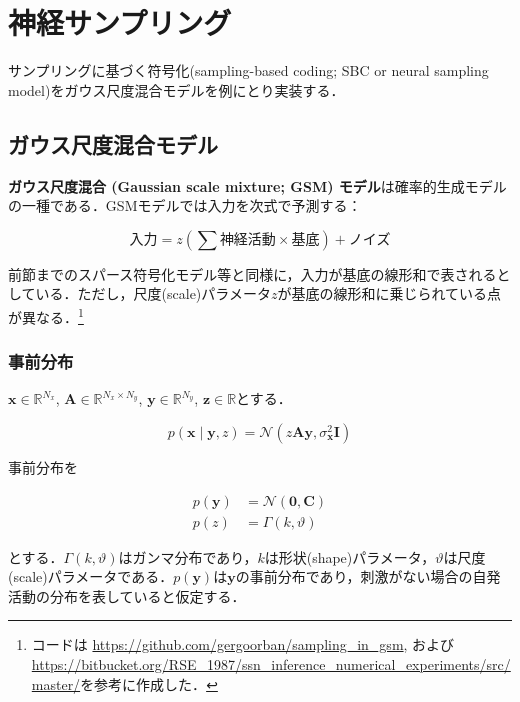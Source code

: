 \section{神経サンプリング}

サンプリングに基づく符号化(sampling-based coding; SBC or neural sampling model)をガウス尺度混合モデルを例にとり実装する．

\subsection{ガウス尺度混合モデル}
\textbf{ガウス尺度混合 (Gaussian scale mixture; GSM) モデル}は確率的生成モデルの一種である\cite{Wainwright1999-cl}\cite{Orban2016-tm}．GSMモデルでは入力を次式で予測する：


\begin{equation}
\text{入力}={z}\left(\sum \text{神経活動} \times \text{基底} \right) + \text{ノイズ}
\end{equation}


前節までのスパース符号化モデル等と同様に，入力が基底の線形和で表されるとしている．ただし，尺度(scale)パラメータ$z$が基底の線形和に乗じられている点が異なる．\footnote{コードは\cite{Orban2016-tm} \url{https://github.com/gergoorban/sampling_in_gsm}, および\cite{Echeveste2020-sh} \url{https://bitbucket.org/RSE_1987/ssn_inference_numerical_experiments/src/master/}を参考に作成した．}


\subsubsection{事前分布}
$\mathbf{x} \in \mathbb{R}^{N_x}$, $\mathbf{A} \in \mathbb{R}^{N_x\times N_y}$, $\mathbf{y} \in \mathbb{R}^{N_y}$, $\mathbf{z} \in \mathbb{R}$とする．


\begin{equation}
p\left(\mathbf{x}\mid\mathbf{y}, z\right)=\mathcal{N}\left(z \mathbf{A} \mathbf{y}, \sigma_{\mathbf{x}}^{2} \mathbf{I}\right)
\end{equation}


事前分布を


\begin{align}
p\left(\mathbf{y}\right)&=\mathcal{N}\left(\mathbf{0}, \mathbf{C}\right)\\
p\left(z\right)&=\Gamma (k, \vartheta)
\end{align}


とする．$\Gamma(k, \vartheta)$はガンマ分布であり，$k$は形状(shape)パラメータ，$\vartheta$は尺度(scale)パラメータである．$p\left(\mathbf{y}\right)$は$\mathbf{y}$の事前分布であり，刺激がない場合の自発活動の分布を表していると仮定する．
